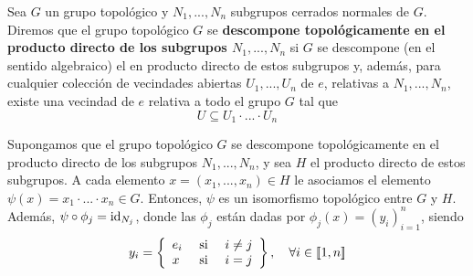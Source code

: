 \documentclass[12pt]{report}
\theoremstyle{largebreak}
\newcommand{\natint}[1]{\ensuremath{[\!\left[#1\right]\!]}}
\newcommand{\id}[1]{\ensuremath{\textup{id}_{#1}}}
\begin{document}
    \begin{mydef}
        Sea $G$ un grupo topológico y $N_1,...,N_n$ subgrupos cerrados normales de $G$. Diremos que el grupo topológico $G$ se \textbf{descompone topológicamente en el producto directo de los subgrupos $N_1,...,N_n$} si $G$ se descompone (en el sentido algebraico) el en producto directo de estos subgrupos y, además, para cualquier colección de vecindades abiertas $U_1,...,U_n$ de $e$, relativas a $N_1,...,N_n$, existe una vecindad de $e$ relativa a todo el grupo $G$ tal que
        \begin{equation*}
            U\subseteq U_1\cdot...\cdot U_n
        \end{equation*}
    \end{mydef}

    \begin{propo}
        Supongamos que el grupo topológico $G$ se descompone topológicamente en el producto directo de los subgrupos $N_1,...,N_n$, y sea $H$ el producto directo de estos subgrupos. A cada elemento $x=(x_1,...,x_n)\in H$ le asociamos el elemento $\psi(x)=x_1\cdot...\cdot x_n\in G$. Entonces, $\psi$ es un isomorfismo topológico entre $G$ y $H$. Además, $\psi\circ\phi_j=\id{N_j}$, donde las $\phi_j$ están dadas por $\phi_j(x)=\left(y_i \right)_{i=1}^n$, siendo
        \begin{equation*}
            y_i=\left\{
                \begin{array}{lcr}
                    e_i & \textup{ si } & i\neq j\\
                    x & \textup{ si } & i=j\\
                \end{array}
             \right\},\quad\forall i\in\natint{1,n}
        \end{equation*}
    \end{propo}
\end{document}

